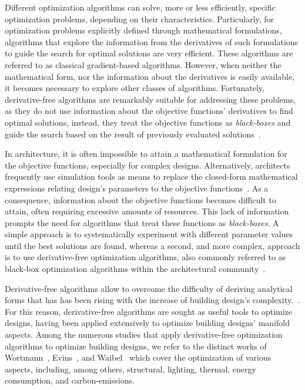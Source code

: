 	Different optimization algorithms can solve, more or less efficiently, specific optimization problems, depending on their characteristics. Particularly, for optimization problems explicitly defined through mathematical formulations, algorithms that explore the information from the derivatives of such formulations to guide the search for optimal solutions are very efficient. These algorithms are referred to as classical gradient-based algorithms. However, when neither the mathematical form, nor the information about the derivatives is easily available, it becomes necessary to explore other classes of algorithms. Fortunately, derivative-free algorithms are remarkably suitable for addressing these problems, as they do not use information about the objective functions' derivatives to find optimal solutions, instead, they treat the objective functions as \textit{black-boxes} and guide the search based on the result of previously evaluated solutions~\cite{Rios2013}.
	
	In architecture, it is often impossible to attain a mathematical formulation for the objective functions, especially for complex designs. Alternatively, architects frequently use simulation tools as means to replace the closed-form mathematical expressions relating design's parameters to the objective functions~\cite{Wortmann2016BBO}. As a consequence, information about the objective functions becomes difficult to attain, often requiring excessive amounts of resources. This lack of information prompts the need for algorithms that treat these functions as \textit{black-boxes}. A simple approach is to systematically experiment with different parameter values until the best solutions are found, whereas a second, and more complex, approach is to use derivative-free optimization algorithms, also commonly referred to as black-box optimization algorithms within the architectural community~\cite{Wortmann2016BBO}. %

	Derivative-free algorithms allow to overcome the difficulty of deriving analytical forms that has has been rising with the increase of building design's complexity.~\cite{Machairas2014}. For this reason, derivative-free algorithms are sought as useful tools to optimize designs, having been applied extensively to optimize building designs' manifold aspects. Among the numerous studies that apply derivative-free optimization algorithms to optimize building designs, we refer to the distinct works of Wortmann~\cite{Wortmann2016BBO,Wortmann2015AdvSBO,Wortmann2017GABESTCHOICE,Wortmann2017Opossum}, Evins~\cite{Evins2011,Evins2012MOO,Evins2013}, and Waibel~\cite{Waibel2018} which cover the optimization of various aspects, including, among others, structural, lighting, thermal, energy consumption, and carbon-emissions. 
	
